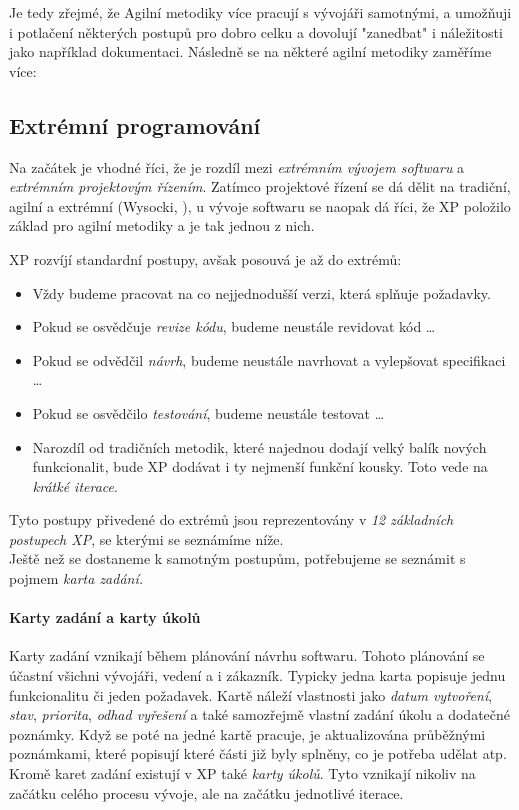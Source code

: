 Je tedy zřejmé, že Agilní metodiky více pracují s vývojáři samotnými, a umožňuji i potlačení některých postupů pro dobro celku a dovolují "zanedbat" i náležitosti jako například dokumentaci. Následně se na některé agilní metodiky zaměříme více:


\subsection{Extrémní programování} \label{methods:XP}

Na začátek je vhodné říci, že je rozdíl mezi \emph{extrémním vývojem softwaru} a \emph{extrémním projektovým řízením}. Zatímco projektové řízení se dá dělit na tradiční, agilní a extrémní (Wysocki, \cite{wysocki}), u vývoje softwaru se naopak dá říci, že XP položilo základ pro agilní metodiky a je tak jednou z nich.

XP rozvíjí standardní postupy, avšak posouvá je až do extrémů:
\begin{itemize}
	\item Vždy budeme pracovat na co nejjednodušší verzi, která splňuje požadavky.
	\item Pokud se osvědčuje \emph{revize kódu}, budeme neustále revidovat kód \ldots
	\item Pokud se odvědčil \emph{návrh}, budeme neustále navrhovat a vylepšovat specifikaci \ldots
	\item Pokud se osvědčilo \emph{testování}, budeme neustále testovat \ldots
	\item Narozdíl od tradičních metodik, které najednou dodají velký balík nových funkcionalit, bude XP dodávat i ty nejmenší funkční kousky. Toto vede na \emph{krátké iterace}.
\end{itemize}

Tyto postupy přivedené do extrémů jsou reprezentovány v \emph{12 základních postupech XP}, se kterými se seznámíme níže.\\
Ještě než se dostaneme k samotným postupům, potřebujeme se seznámit s pojmem \emph{karta zadání.}

\paragraph{Karty zadání a karty úkolů} \label{methods:XP:issues}
Karty zadání vznikají během plánování návrhu softwaru. Tohoto plánování se účastní všichni vývojáři, vedení a i zákazník. Typicky jedna karta popisuje jednu funkcionalitu či jeden požadavek. Kartě náleží vlastnosti jako \emph{datum vytvoření}, \emph{stav}, \emph{priorita}, \emph{odhad vyřešení} a také samozřejmě vlastní zadání úkolu a dodatečné poznámky. Když se poté na jedné kartě pracuje, je aktualizována průběžnými poznámkami, které popisují které části již byly splněny, co je potřeba udělat atp.\\
Kromě karet zadání existují v XP také \emph{karty úkolů}. Tyto vznikají nikoliv na začátku celého procesu vývoje, ale na začátku jednotlivé iterace.


